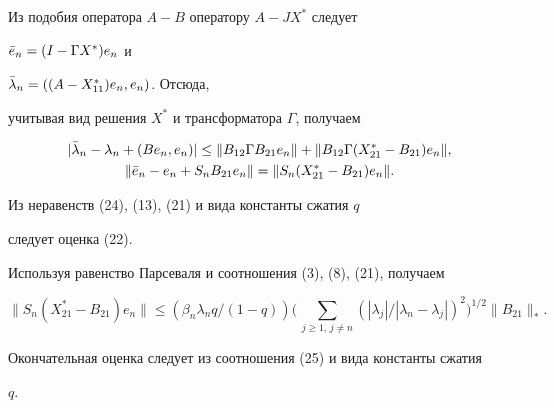 \begin{pf}


Из подобия оператора $A-B$ оператору $A-JX^*$ следует


$\Bar e_n=(I-\Gamma X^*)e_n$ и


$\Bar\lambda_n=((A-X^*_{11})e_n,e_n)$. Отсюда,


учитывая вид решения $X^*$ и трансформатора $\Gamma$, получаем


\begin{gather}


|\Bar\lambda_n-\lambda_n+(Be_n,e_n)|\le


\|B_{12}\Gamma B_{21}e_n\|+\|B_{12}\Gamma(X^*_{21}-B_{21})e_n\|,\\


\|\Bar e_n-e_n+S_nB_{21}e_n\|=\|S_n(X^*_{21}-B_{21})e_n\|.


\end{gather}


Из неравенств (24), (13), (21) и вида константы сжатия $q$


следует оценка (22).





Используя равенство Парсеваля и соотношения (3), (8), (21), получаем


$$


\|S_n(X^*_{21}-B_{21})e_n\|\le


(\beta_n\lambda_nq/(1-q))\biggl(\,


\sum_{j\ge 1,\,j\ne n}(|\lambda_j|/|\lambda_n-\lambda_j|)^2


\biggr)^{1/2}\|B_{21}\|_*.


$$


Окончательная оценка следует из соотношения (25) и вида константы сжатия


$q$.


\end{pf}





